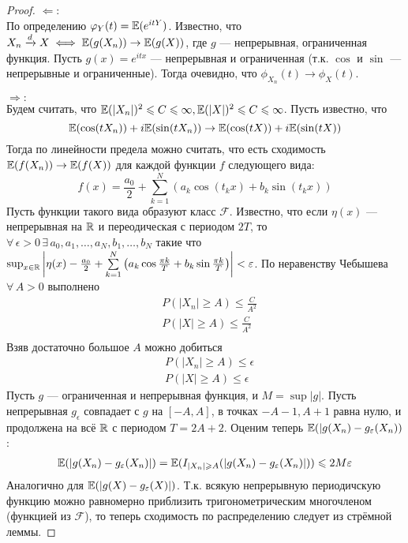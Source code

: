 \begin{proof}
    $\Leftarrow\colon$\\
    По определению $\varphi_Y(t) = \mathbb{E}(e^{itY})$. Известно, что $X_n \xrightarrow{d} X \iff \mathbb{E}(g(X_n)) \to \mathbb{E}(g(X))$,
    где $g$ --- непрерывная, ограниченная функция. Пусть $g(x) = e^{itx}$ --- непрерывная и ограниченная (т.к.
    $\cos$ и $\sin$ --- непрерывные и ограниченные). Тогда очевидно, что $\phi_{X_n}(t) \to \phi_{X}(t)$.

    $\Rightarrow\colon$\\
    Будем считать, что $\mathbb{E}(|X_n|)^2 \leqslant C \leqslant \infty, \mathbb{E}(|X|)^2 \leqslant C \leqslant \infty$. Пусть известно, что
    \[
        \mathbb{E}(\cos(tX_n)) + i\mathbb{E}(\sin(tX_n)) \to \mathbb{E}(\cos(tX)) + i\mathbb{E}(\sin(tX))
    \]
    Тогда по линейности предела можно считать, что есть сходимость $\mathbb{E}(f(X_n)) \to \mathbb{E}(f(X))$ для каждой функции
    $f$ следующего вида:
    \[
        f(x) = \frac{a_0}{2} + \sum\limits_{k = 1}^N \left( a_k\cos(t_kx) + b_k\sin(t_kx) \right)
    \]
    Пусть функции такого вида образуют класс $\mathcal{F}$. Известно, что если $\eta(x)$ --- непрерывная на $\mathbb{R}$
    и переодическая с периодом $2T$, то $\forall\, \epsilon > 0\, \exists\, a_0, a_1, \ldots, a_N, b_1, \ldots, b_N$
    такие что $\mathop{\mathrm{sup}}_{x \in \mathbb{R}}\left| \eta(x) - \frac{a_0}{2} + \sum\limits_{k = 1}^{N} \left( a_k\cos\frac{\pi k}{T}
    + b_k\sin\frac{\pi k}{T}\right) \right| < \varepsilon$.
    По неравенству Чебышева $\forall\, A > 0$ выполнено
    \begin{align*}
        &P(|X_n| \geq A) \leq \frac{C}{A^2}\\
        &P(|X| \geq A) \leq \frac{C}{A^2}\\
    \end{align*}
    Взяв достаточно большое $A$ можно добиться
    \begin{align*}
        &P(|X_n| \geq A) \leq \epsilon\\
        &P(|X| \geq A) \leq \epsilon
    \end{align*}
    Пусть $g$ --- ограниченная и непрерывная функция, и $M = \sup |g|$. Пусть непрерывная $g_{\epsilon}$
    совпадает с $g$ на $[-A, A]$, в точках $-A - 1, A + 1$ равна нулю, и продолжена на всё $\mathbb{R}$ с периодом
    $T = 2A + 2$. Оценим теперь $\mathbb{E}(|g(X_n) - g_{\varepsilon}(X_n))$:
    \begin{align*}
        \mathbb{E}(|g(X_n) - g_{\varepsilon}(X_n)|) =
        \mathbb{E}(I_{|X_n| \geqslant A}(|g(X_n) - g_{\varepsilon}(X_n)|)) \leqslant 2M\varepsilon
    \end{align*}
    Аналогично для $\mathbb{E}(|g(X) - g_{\varepsilon}(X)|)$. Т.к. всякую непрерывную периодичскую функцию можно равномерно
    приблизить тригонометрическим многочленом (функцией из $\mathcal{F}$), то теперь сходимость по распределению
    следует из стрёмной леммы.
\end{proof}
